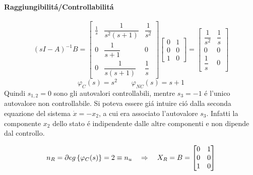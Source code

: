 \begin{Exercise}[title={Studio completo del sistema e stabilizzazione}, difficulty=3]
		\paragraph{Raggiungibilit\'a/Controllabilit\'a}
			\[
				(sI-A)^{-1}B =
				\begin{bmatrix}
					\frac{1}{s} & \dfrac{1}{s^2(s+1)} & \dfrac{1}{s^2}\\[.5cm]
					0 & \dfrac{1}{s+1} & 0\\[.5cm]
					0 & \dfrac{1}{s(s+1)} & \dfrac{1}{s}
				\end{bmatrix}
				\begin{bmatrix}
					0 & 1\\
					0 & 0\\
					1 & 0
				\end{bmatrix} =
				\begin{bmatrix}
					\dfrac{1}{s^2} & \dfrac{1}{s}\\[.5cm]
					0 & 0\\[.5cm]
					\dfrac{1}{s} & 0
				\end{bmatrix}
			\]
			\[ \varphi_C(s) = s^2 \qquad \varphi_{NC}(s) = s+1 \]
			Quindi $ s_{1,2} = 0 $ sono gli autovalori controllabili, mentre $ s_3 = -1 $ \'e l'unico autovalore non controllabile. Si poteva essere gi\'a intuire ci\'o dalla seconda equazione del sistema $ \dot x = -x_2 $, a cui era associato l'autovalore $ s_3 $. Infatti la componente $ x_2 $ dello stato \'e indipendente dalle altre componenti e non dipende dal controllo.
			
			\[
				n_R = \partial eg \left\lbrace \varphi_C(s) \right\rbrace = 2 \equiv n_u \quad\Rightarrow\quad X_R = B =
				\begin{bmatrix}
					0 & 1\\
					0 & 0\\
					1 & 0
				\end{bmatrix}
			\]
			

\end{Exercise}
